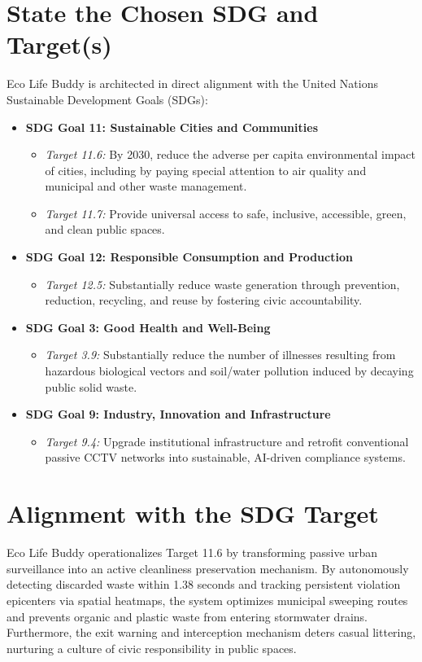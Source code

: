 \documentclass[12pt,a4paper]{report}
\begin{document}
\section{State the Chosen SDG and Target(s)}
Eco Life Buddy is architected in direct alignment with the United Nations Sustainable Development Goals (SDGs):

\begin{itemize}
\item \textbf{SDG Goal 11: Sustainable Cities and Communities}
  \begin{itemize}
  \item \textit{Target 11.6:} By 2030, reduce the adverse per capita environmental impact of cities, including by paying special attention to air quality and municipal and other waste management.
  \item \textit{Target 11.7:} Provide universal access to safe, inclusive, accessible, green, and clean public spaces.
  \end{itemize}
\item \textbf{SDG Goal 12: Responsible Consumption and Production}
  \begin{itemize}
  \item \textit{Target 12.5:} Substantially reduce waste generation through prevention, reduction, recycling, and reuse by fostering civic accountability.
  \end{itemize}
\item \textbf{SDG Goal 3: Good Health and Well-Being}
  \begin{itemize}
  \item \textit{Target 3.9:} Substantially reduce the number of illnesses resulting from hazardous biological vectors and soil/water pollution induced by decaying public solid waste.
  \end{itemize}
\item \textbf{SDG Goal 9: Industry, Innovation and Infrastructure}
  \begin{itemize}
  \item \textit{Target 9.4:} Upgrade institutional infrastructure and retrofit conventional passive CCTV networks into sustainable, AI-driven compliance systems.
  \end{itemize}
\end{itemize}

\section{Alignment with the SDG Target}
Eco Life Buddy operationalizes Target 11.6 by transforming passive urban surveillance into an active cleanliness preservation mechanism. By autonomously detecting discarded waste within 1.38 seconds and tracking persistent violation epicenters via spatial heatmaps, the system optimizes municipal sweeping routes and prevents organic and plastic waste from entering stormwater drains. Furthermore, the exit warning and interception mechanism deters casual littering, nurturing a culture of civic responsibility in public spaces.
\end{document}

